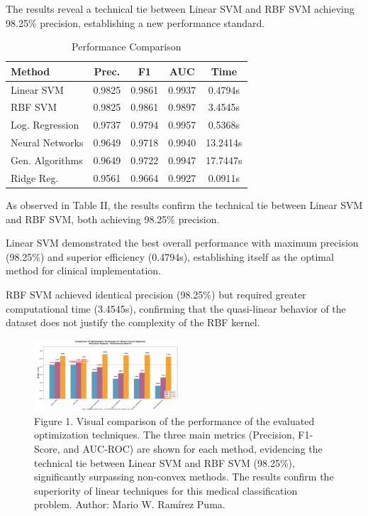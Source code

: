 \documentclass[conference]{IEEEtran}
\begin{document}
The results reveal a technical tie between Linear SVM and RBF SVM achieving 98.25\% precision, establishing a new performance standard.

\begin{table}[htbp]
\caption{Performance Comparison}
\begin{center}
\footnotesize
\begin{tabular}{lcccc}
\toprule
Method & Prec. & F1 & AUC & Time \\
\midrule
Linear SVM & 0.9825 & 0.9861 & 0.9937 & 0.4794s \\
RBF SVM & 0.9825 & 0.9861 & 0.9897 & 3.4545s \\
Log. Regression & 0.9737 & 0.9794 & 0.9957 & 0.5368s \\
Neural Networks & 0.9649 & 0.9718 & 0.9940 & 13.2414s \\
Gen. Algorithms & 0.9649 & 0.9722 & 0.9947 & 17.7447s \\
Ridge Reg. & 0.9561 & 0.9664 & 0.9927 & 0.0911s \\
\bottomrule
\end{tabular}
\label{tab2}
\end{center}
\end{table}

As observed in Table II, the results confirm the technical tie between Linear SVM and RBF SVM, both achieving 98.25\% precision.

Linear SVM demonstrated the best overall performance with maximum precision (98.25\%) and superior efficiency (0.4794s), establishing itself as the optimal method for clinical implementation.

RBF SVM achieved identical precision (98.25\%) but required greater computational time (3.4545s), confirming that the quasi-linear behavior of the dataset does not justify the complexity of the RBF kernel.

\begin{figure}[htbp]
\centering
\includegraphics[width=0.48\textwidth]{esta.png}
\caption{Figure 1. Visual comparison of the performance of the evaluated optimization techniques. The three main metrics (Precision, F1-Score, and AUC-ROC) are shown for each method, evidencing the technical tie between Linear SVM and RBF SVM (98.25\%), significantly surpassing non-convex methods. The results confirm the superiority of linear techniques for this medical classification problem. Author: Mario W. Ramírez Puma.}
\label{fig:cap3}
\end{figure}
\end{document}
